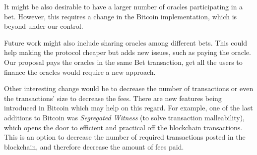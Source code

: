 It might be also desirable to have a larger number of oracles participating in
  a bet.
However, this requires a change in the Bitcoin implementation, which is beyond
  under our control.

Future work might also include sharing oracles among different bets.
This could help making the protocol cheaper but adds new issues, such as paying
  the oracle.
Our proposal pays the oracles in the same Bet transaction, get all the users to
  finance the oracles would require a new approach.

Other interesting change would be to decrease the number of transactions or
  even the transactions' size to decrease the fees.
There are new features being introduced in Bitcoin which may help on this
  regard.
For example, one of the last additions to Bitcoin was \textit{Segregated Witness}
  (to solve transaction malleability), which opens the door to efficient and
  practical off the blockchain transactions.
This is an option to decrease the number of required transactions posted in the
  blockchain, and therefore decrease the amount of fees paid.
